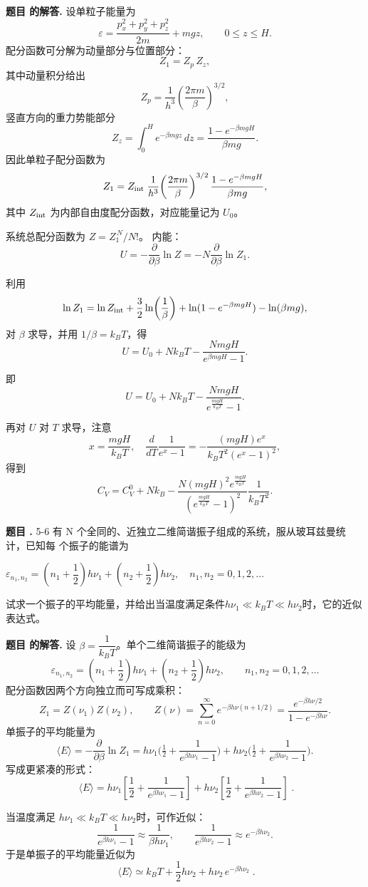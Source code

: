 \documentclass[12pt, a4paper, oneside]{ctexart}
\newcounter{problemname}
\newenvironment{problem}
  {\begin{shaded}\stepcounter{problemname}\par\noindent\textbf{题目 \theproblemname. }}
  {\end{shaded}\par}
\newenvironment{solution}
  {\par\noindent\textbf{题目 \theproblemname 的解答. }}
  {\par}
\begin{document}
\begin{solution}
  设单粒子能量为
\[
\varepsilon=\frac{p_x^2+p_y^2+p_z^2}{2m}+mg z,\qquad 0\le z\le H.
\]
配分函数可分解为动量部分与位置部分：
\[
Z_1=Z_p\,Z_z,
\]
其中动量积分给出
\[
Z_p=\frac{1}{h^3}\!\left(\frac{2\pi m}{\beta}\right)^{3/2},
\]
竖直方向的重力势能部分
\[
Z_z=\int_0^H e^{-\beta mg z}\,dz
=\frac{1-e^{-\beta mg H}}{\beta mg}.
\]
因此单粒子配分函数为
\[
Z_1=Z_{\rm int}\;\frac{1}{h^3}\!\left(\frac{2\pi m}{\beta}\right)^{3/2}
\frac{1-e^{-\beta mg H}}{\beta mg},
\]
其中 \(Z_{\rm int}\) 为内部自由度配分函数，对应能量记为 \(U_0\)。

系统总配分函数为 \(Z=Z_1^{\,N}/N!\)。  
内能：
\[
U=-\frac{\partial}{\partial\beta}\ln Z
=-N\frac{\partial}{\partial\beta}\ln Z_1.
\]

利用
\[
\ln Z_1=\ln Z_{\rm int}+\frac{3}{2}\ln\!\left(\frac{1}{\beta}\right)
+\ln(1-e^{-\beta mgH})-\ln(\beta mg),
\]
对 \(\beta\) 求导，并用 \(1/\beta=k_B T\)，得
\[
U
=U_0+N k_B T - \frac{N mgH}{e^{\beta mgH}-1}.
\]

即
\[
\boxed{
U=U_0+N k_B T-\frac{N mgH}{e^{\frac{mgH}{k_B T}}-1}
}.
\]

再对 \(U\) 对 \(T\) 求导，注意
\[
x=\frac{mgH}{k_B T},
\quad
\frac{d}{dT}\frac{1}{e^x-1}
=-\frac{(mgH)e^x}{k_B T^2 (e^x-1)^2},
\]
得到
\[
\boxed{
C_V=C_V^0
+N k_B
-\frac{N(mgH)^2e^{\frac{mgH}{k_B T}}}{(e^{\frac{mgH}{k_B T}}-1)^2}
\frac{1}{k_B T^2}
}.
\]
\end{solution}

\begin{problem}{5-6}
  有 N 个全同的、近独立二维简谐振子组成的系统，服从玻耳兹曼统计，已知每 个振子的能谱为

  \centerline{$\varepsilon_{n_1, n_2} = \left(n_1 + \dfrac{1}{2}\right) h \nu_1 + \left(n_2 + \dfrac{1}{2}\right) h \nu_2, \quad n_1, n_2 = 0, 1, 2, \ldots$}

  试求一个振子的平均能量，并给出当温度满足条件$h\nu_1 \ll k_B T \ll h\nu_2$时，它的近似表达式。
\end{problem}

\begin{solution}
  设 \(\beta=\dfrac{1}{k_B T}\)。单个二维简谐振子的能级为
\[
\varepsilon_{n_1,n_2}
=\left(n_1+\frac12\right)h\nu_1+\left(n_2+\frac12\right)h\nu_2,
\qquad n_1,n_2=0,1,2,\ldots
\]
配分函数因两个方向独立而可写成乘积：
\[
Z_1=Z(\nu_1)Z(\nu_2),\qquad
Z(\nu)=\sum_{n=0}^\infty e^{-\beta h\nu(n+1/2)}
=\frac{e^{-\beta h\nu/2}}{1-e^{-\beta h\nu}}.
\]
单振子的平均能量为
\[
\langle E\rangle
=-\frac{\partial}{\partial\beta}\ln Z_1
=h\nu_1\Big(\tfrac12+\frac{1}{e^{\beta h\nu_1}-1}\Big)
+ h\nu_2\Big(\tfrac12+\frac{1}{e^{\beta h\nu_2}-1}\Big).
\]
写成更紧凑的形式：
\[
\boxed{\;
\langle E\rangle
= h\nu_1\left[\frac{1}{2}+\frac{1}{e^{\beta h\nu_1}-1}\right]
+ h\nu_2\left[\frac{1}{2}+\frac{1}{e^{\beta h\nu_2}-1}\right]\; }.
\]

当温度满足 \(h\nu_1\ll k_B T\ll h\nu_2\)时，可作近似：
\[
\frac{1}{e^{\beta h\nu_1}-1}\approx\frac{1}{\beta h\nu_1},\qquad
\frac{1}{e^{\beta h\nu_2}-1}\approx e^{-\beta h\nu_2}.
\]
于是单振子的平均能量近似为
\[
\boxed{\;
\langle E\rangle \simeq k_B T + \frac{1}{2}h\nu_2 + h\nu_2\,e^{-\beta h\nu_2}\; }.
\]
\end{solution}
\end{document}
